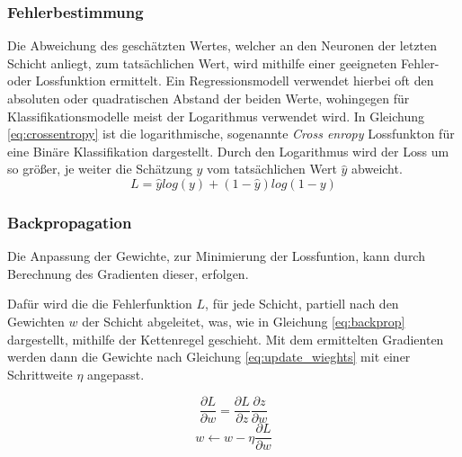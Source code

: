 \subsubsection{Fehlerbestimmung}
Die Abweichung des geschätzten Wertes, welcher an den Neuronen
der letzten Schicht anliegt, zum tatsächlichen Wert,
wird mithilfe einer geeigneten Fehler- oder Lossfunktion ermittelt.
Ein Regressionsmodell verwendet hierbei oft 
den absoluten oder quadratischen Abstand der beiden 
Werte, wohingegen für Klassifikationsmodelle meist 
der Logarithmus verwendet wird.
In Gleichung \ref{eq:crossentropy} ist die logarithmische, sogenannte 
\textit{Cross enropy} Lossfunkton für eine Binäre Klassifikation 
dargestellt.
Durch den Logarithmus wird der Loss um so größer,
je weiter die Schätzung $y$ vom 
tatsächlichen Wert $\hat{y}$ abweicht.
\vspace{0.5cm}
\begin{equation}
    \label{eq:crossentropy}
    L = \hat{y}log(y) + (1 - \hat{y})log(1 - y)
\end{equation}
\vspace{0.5cm}

\subsubsection{Backpropagation}

Die Anpassung der Gewichte, zur Minimierung der Lossfuntion, 
kann durch Berechnung des Gradienten dieser, erfolgen.

Dafür wird die die Fehlerfunktion $L$, für jede Schicht, partiell
nach den Gewichten $w$ der Schicht abgeleitet,
was, wie in Gleichung \ref{eq:backprop}
dargestellt, mithilfe der Kettenregel geschieht.
Mit dem ermittelten Gradienten werden
dann die Gewichte nach Gleichung \ref{eq:update_wieghts}
mit einer Schrittweite $\eta$ angepasst.

\vspace{0.5cm}
\begin{equation}
    \label{eq:backprop}
    \frac{\partial L}{\partial w} = \frac{\partial L}{\partial z}\frac{\partial z}{\partial w}
\end{equation}
\vspace{0.5cm}
\begin{equation}
    \label{eq:update_wieghts}
    w  \leftarrow w - \eta \frac{\partial L}{\partial w}
\end{equation}
\vspace{1cm}



